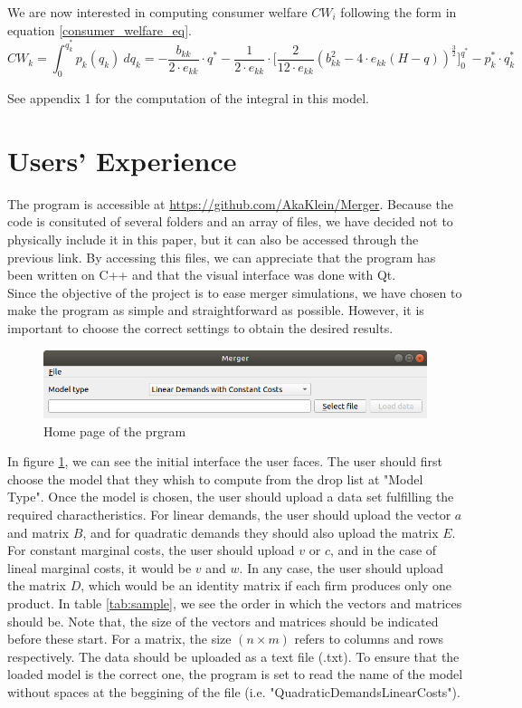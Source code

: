 \documentclass[12pt]{article}
\begin{document}
We are now interested in computing consumer welfare $CW_i$ following the form in equation \ref{consumer_welfare_eq}.
\begin{equation*}
CW_k = \int_0^{q_k^*} p_k(q_k) \ dq_k = -\frac{b_{kk}}{2 \cdot e_{kk}} \cdot q^* -\frac{1}{2 \cdot e_{kk}} \cdot \bigg[\frac{2}{12 \cdot e_{kk}} (b_{kk}^2 - 4 \cdot e_{kk}(H - q))^{\frac{3}{2}}\bigg]_0^{q^*} - p_k^* \cdot q_k^*
\end{equation*}

See appendix 1 for the computation of the integral in this model.  

\section{Users' Experience}

The program is accessible at  \url{https://github.com/AkaKlein/Merger}. Because the code is consituted of several folders and an array of files, we have decided not to physically include it in this paper, but it can also be accessed through the previous link. By accessing this files, we can appreciate that the program has been written on C++ and that the visual interface was done with Qt.\\
Since the objective of the project is to ease merger simulations, we have chosen to make the program as simple and straightforward as possible.  However, it is important to choose the correct settings to obtain the desired results.
\begin{figure}[H]
\begin{center}
  \includegraphics[width=10 cm]{home}
\caption{\label{home}Home page of the prgram}
\end{center}
\end{figure}

In figure \ref{home}, we can see the initial interface the user faces. The user should first choose the model that they whish to compute from the drop list at "Model Type". Once the model is chosen, the user should upload a data set fulfilling the required charactheristics. For linear demands, the user should upload the vector $a$ and matrix $B$, and for quadratic demands they should also upload the matrix $E$. For constant marginal costs, the user should upload $v$ or $c$, and in the case of lineal marginal costs, it would be $v$ and $w$. In any case, the user should upload the matrix $D$, which would be an identity matrix if each firm produces only one product. In table \ref{tab:sample}, we see the order in which the vectors and matrices should be. Note that, the size of the vectors and matrices should be indicated before these start. For a matrix, the size $(n \times m)$ refers to columns and rows respectively. The data should be uploaded as a text file (.txt). To ensure that the loaded model is the correct one, the program is set to read the name of the model without spaces at the beggining of the file (i.e. "QuadraticDemandsLinearCosts").
\end{document}
